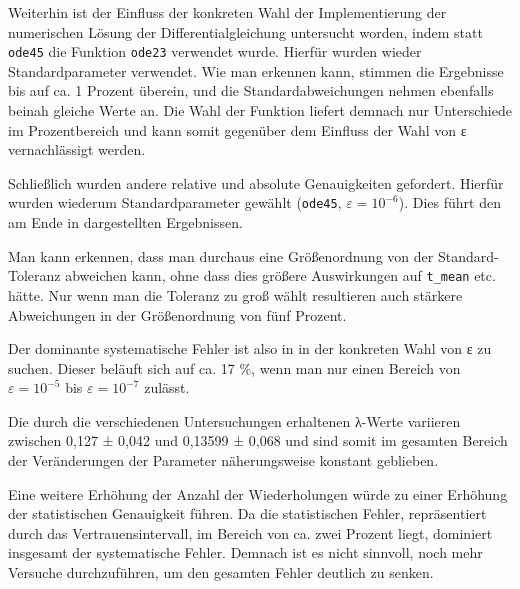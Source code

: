 Weiterhin ist der Einfluss der konkreten Wahl der Implementierung der numerischen
Lösung der Differentialgleichung untersucht worden, indem statt \texttt{ode45}
die Funktion \texttt{ode23} verwendet wurde. Hierfür wurden wieder 
Standardparameter verwendet. Wie man erkennen kann, stimmen die Ergebnisse bis
auf ca. 1 Prozent überein, und die Standardabweichungen nehmen ebenfalls beinah
gleiche Werte an. Die Wahl der Funktion liefert demnach nur Unterschiede im 
Prozentbereich und kann somit gegenüber dem Einfluss der Wahl von ε
vernachlässigt werden.

Schließlich wurden andere relative und absolute Genauigkeiten gefordert. Hierfür
wurden wiederum Standardparameter gewählt (\texttt{ode45}, $ε=10^{-6}$). Dies
führt den am Ende in  dargestellten Ergebnissen.

Man kann erkennen, dass man durchaus eine Größenordnung von der Standard-Toleranz
abweichen kann, ohne dass dies größere Auswirkungen auf \texttt{t\_mean} etc.
hätte. Nur wenn man die Toleranz zu groß wählt resultieren auch stärkere
Abweichungen in der Größenordnung von fünf Prozent.

Der dominante systematische Fehler ist also in in der konkreten Wahl von ε zu
suchen. Dieser beläuft sich auf ca. 17 \%, wenn man nur einen Bereich von $ε = 
10^{-5}$ bis $ε = 10^{-7}$ zulässt.

Die durch die verschiedenen Untersuchungen erhaltenen λ-Werte variieren zwischen
0,127 ± 0,042 und 0,13599 ± 0,068 und sind somit im gesamten Bereich der
Veränderungen der Parameter näherungsweise konstant geblieben.

Eine weitere Erhöhung der Anzahl der Wiederholungen würde zu einer Erhöhung der 
statistischen Genauigkeit führen. Da die statistischen Fehler, repräsentiert
durch das Vertrauensintervall, im Bereich von ca. zwei Prozent liegt, dominiert
insgesamt der systematische Fehler. Demnach ist es nicht sinnvoll, noch mehr 
Versuche durchzuführen, um den gesamten Fehler deutlich zu senken.